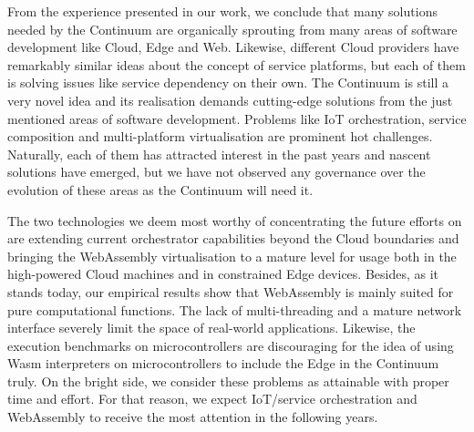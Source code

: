 From the experience presented in our work, we conclude that many solutions needed by the Continuum are organically sprouting from many areas of software development like Cloud, Edge and Web. Likewise, different Cloud providers have remarkably similar ideas about the concept of service platforms, but each of them is solving issues like service dependency on their own. The Continuum is still a very novel idea and its realisation demands cutting-edge solutions from the just mentioned areas of software development. Problems like IoT orchestration, service composition and multi-platform virtualisation are prominent hot challenges. Naturally, each of them has attracted interest in the past years and nascent solutions have emerged, but we have not observed any governance over the evolution of these areas as the Continuum will need it.

The two technologies we deem most worthy of concentrating the future efforts on are extending current orchestrator capabilities beyond the Cloud boundaries and bringing the WebAssembly virtualisation to a mature level for usage both in the high-powered Cloud machines and in constrained Edge devices. Besides, as it stands today, our empirical results show that WebAssembly is mainly suited for pure computational functions. The lack of multi-threading and a mature network interface severely limit the space of real-world applications. Likewise, the execution benchmarks on microcontrollers are discouraging for the idea of using Wasm interpreters on microcontrollers to include the Edge in the Continuum truly. On the bright side, we consider these problems as attainable with proper time and effort. For that reason, we expect IoT/service orchestration and WebAssembly to receive the most attention in the following years.

